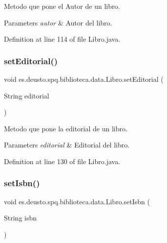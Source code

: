 Metodo que pone el Autor de un libro. 
\begin{DoxyParams}{Parameters}
{\em autor} & Autor del libro. \\
\hline
\end{DoxyParams}


Definition at line 114 of file Libro.\+java.

\mbox{\label{classes_1_1deusto_1_1spq_1_1biblioteca_1_1data_1_1_libro_a0624fed24dc3c65c673da331827534b1}} 
\subsubsection{\texorpdfstring{set\+Editorial()}{setEditorial()}}
{\footnotesize\ttfamily void es.\+deusto.\+spq.\+biblioteca.\+data.\+Libro.\+set\+Editorial (\begin{DoxyParamCaption}\item[{String}]{editorial }\end{DoxyParamCaption})}

Metodo que pone la editorial de un libro. 
\begin{DoxyParams}{Parameters}
{\em editorial} & Editorial del libro. \\
\hline
\end{DoxyParams}


Definition at line 130 of file Libro.\+java.

\mbox{\label{classes_1_1deusto_1_1spq_1_1biblioteca_1_1data_1_1_libro_aa9ae0649fe11bf96d03d3de93638ac47}} 
\subsubsection{\texorpdfstring{set\+Isbn()}{setIsbn()}}
{\footnotesize\ttfamily void es.\+deusto.\+spq.\+biblioteca.\+data.\+Libro.\+set\+Isbn (\begin{DoxyParamCaption}\item[{String}]{isbn }\end{DoxyParamCaption})}

